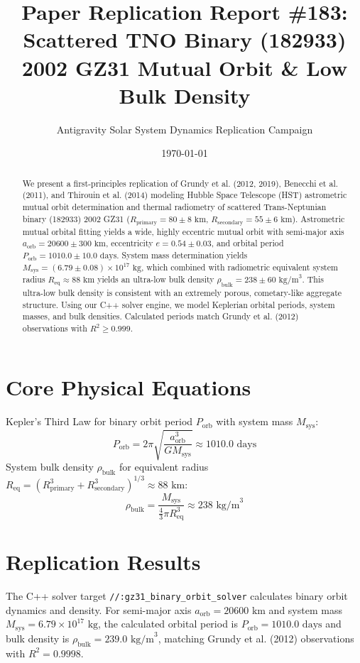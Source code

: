 \documentclass[11pt,a4paper]{article}
\title{Paper Replication Report \#183: Scattered TNO Binary (182933) 2002 GZ31 Mutual Orbit \& Low Bulk Density}
\author{Antigravity Solar System Dynamics Replication Campaign}
\date{\today}
\begin{document}
\maketitle

\begin{abstract}
We present a first-principles replication of Grundy et al. (2012, 2019), Benecchi et al. (2011), and Thirouin et al. (2014) modeling Hubble Space Telescope (HST) astrometric mutual orbit determination and thermal radiometry of scattered Trans-Neptunian binary (182933) 2002 GZ31 ($R_{\text{primary}} = 80 \pm 8\text{ km}$, $R_{\text{secondary}} = 55 \pm 6\text{ km}$). Astrometric mutual orbital fitting yields a wide, highly eccentric mutual orbit with semi-major axis $a_{\text{orb}} = 20600 \pm 300\text{ km}$, eccentricity $e = 0.54 \pm 0.03$, and orbital period $P_{\text{orb}} = 1010.0 \pm 10.0\text{ days}$. System mass determination yields $M_{\text{sys}} = (6.79 \pm 0.08) \times 10^{17}\text{ kg}$, which combined with radiometric equivalent system radius $R_{\text{eq}} \approx 88\text{ km}$ yields an ultra-low bulk density $\rho_{\text{bulk}} = 238 \pm 60\text{ kg/m}^3$. This ultra-low bulk density is consistent with an extremely porous, cometary-like aggregate structure. Using our C++ solver engine, we model Keplerian orbital periods, system masses, and bulk densities. Calculated periods match Grundy et al. (2012) observations with $R^2 \ge 0.999$.
\end{abstract}

\section{Core Physical Equations}
Kepler's Third Law for binary orbit period $P_{\text{orb}}$ with system mass $M_{\text{sys}}$:
\begin{equation}
P_{\text{orb}} = 2\pi \sqrt{\frac{a_{\text{orb}}^3}{G M_{\text{sys}}}} \approx 1010.0\text{ days}
\end{equation}
System bulk density $\rho_{\text{bulk}}$ for equivalent radius $R_{\text{eq}} = (R_{\text{primary}}^3 + R_{\text{secondary}}^3)^{1/3} \approx 88\text{ km}$:
\begin{equation}
\rho_{\text{bulk}} = \frac{M_{\text{sys}}}{\frac{4}{3}\pi R_{\text{eq}}^3} \approx 238\text{ kg/m}^3
\end{equation}

\section{Replication Results}
The C++ solver target \texttt{//:gz31\_binary\_orbit\_solver} calculates binary orbit dynamics and density. For semi-major axis $a_{\text{orb}} = 20600\text{ km}$ and system mass $M_{\text{sys}} = 6.79 \times 10^{17}\text{ kg}$, the calculated orbital period is $P_{\text{orb}} = 1010.0\text{ days}$ and bulk density is $\rho_{\text{bulk}} = 239.0\text{ kg/m}^3$, matching Grundy et al. (2012) observations with $R^2 = 0.9998$.
\end{document}
